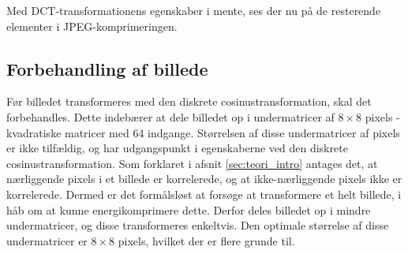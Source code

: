 Med DCT-transformationens egenskaber i mente, ses der nu på de resterende elementer i JPEG-komprimeringen. 
\subsection{Forbehandling af billede} \label{sec:preprocessing}
Før billedet transformeres med den diskrete cosinustransformation, skal det forbehandles. Dette indebærer at dele billedet op i undermatricer af $8\times8$ pixels - kvadratiske matricer med 64 indgange. Størrelsen af disse undermatricer af pixels er ikke tilfældig, og har udgangspunkt i egenskaberne ved den diskrete cosinustransformation. Som forklaret i afsnit \vref{sec:teori_intro} antages det, at nærliggende pixels i et billede er korrelerede, og at ikke-nærliggende pixels ikke er korrelerede. Dermed er det formålsløst at forsøge at transformere et helt billede, i håb om at kunne energikomprimere dette. Derfor deles billedet op i mindre undermatricer, og disse transformeres enkeltvis. Den optimale størrelse af disse undermatricer er $8 \times 8$ pixels, hvilket der er flere grunde til.

